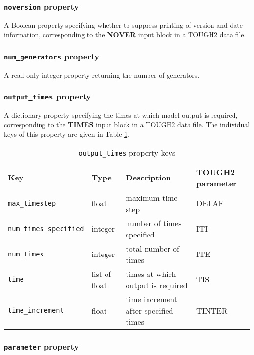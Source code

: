 \subsubsection{\texttt{noversion} property}

A Boolean property specifying whether to suppress printing of version and date information, corresponding to the \textbf{NOVER} input block in a TOUGH2 data file.

\subsubsection{\texttt{num\_generators} property}

A read-only integer property returning the number of generators.

\subsubsection{\texttt{output\_times} property}

A dictionary property specifying the times at which model output is required, corresponding to the \textbf{TIMES} input block in a TOUGH2 data file.  The individual keys of this property are given in Table \ref{tb:outputtimes}.

\begin{table}
  \begin{center}
    \begin{tabular}{|l|l|l|p{20mm}|}
      \hline
      \textbf{Key} & \textbf{Type} & \textbf{Description} & \textbf{TOUGH2 parameter}\\
      \hline
      \texttt{max\_timestep} & float & maximum time step & DELAF\\
      \texttt{num\_times\_specified} & integer & number of times specified & ITI\\
      \texttt{num\_times} & integer & total number of times & ITE\\
      \texttt{time} & list of float & times at which output is required & TIS\\
      \texttt{time\_increment} & float & time increment after specified times & TINTER\\
      \hline
    \end{tabular}
    \caption{\texttt{output\_times} property keys}
    \label{tb:outputtimes}
  \end{center}
\end{table}

\subsubsection{\texttt{parameter} property}

